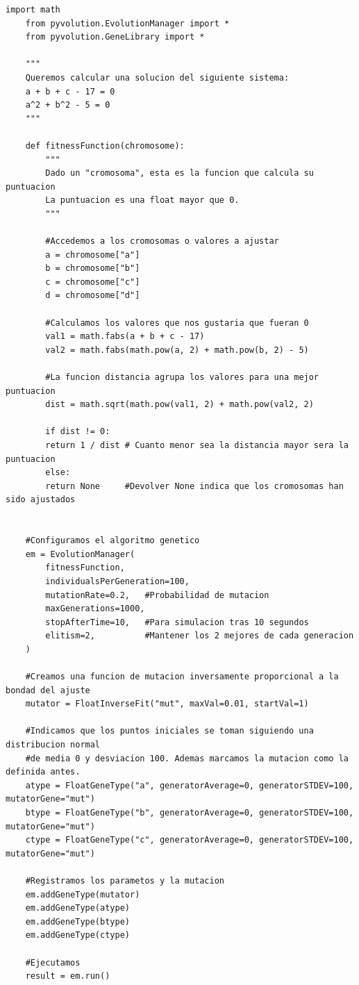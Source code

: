 \documentclass[12pt,a4paper]{article}
\begin{document}
		\begin{lstlisting}[basicstyle=\tiny]
	import math
	from pyvolution.EvolutionManager import *
	from pyvolution.GeneLibrary import *
	
	"""
	Queremos calcular una solucion del siguiente sistema:
	a + b + c - 17 = 0
	a^2 + b^2 - 5 = 0
	"""
		
	def fitnessFunction(chromosome):
		"""
		Dado un "cromosoma", esta es la funcion que calcula su puntuacion
		La puntuacion es una float mayor que 0.
		"""
		
		#Accedemos a los cromosomas o valores a ajustar
		a = chromosome["a"]
		b = chromosome["b"]
		c = chromosome["c"]
		d = chromosome["d"]
		
		#Calculamos los valores que nos gustaria que fueran 0
		val1 = math.fabs(a + b + c - 17)
		val2 = math.fabs(math.pow(a, 2) + math.pow(b, 2) - 5)
		
		#La funcion distancia agrupa los valores para una mejor puntuacion
		dist = math.sqrt(math.pow(val1, 2) + math.pow(val2, 2)
		
		if dist != 0:
		return 1 / dist # Cuanto menor sea la distancia mayor sera la puntuacion
		else:
		return None     #Devolver None indica que los cromosomas han sido ajustados
		
		
	#Configuramos el algoritmo genetico
	em = EvolutionManager(
		fitnessFunction,
		individualsPerGeneration=100,
		mutationRate=0.2,	#Probabilidad de mutacion
		maxGenerations=1000,
		stopAfterTime=10,   #Para simulacion tras 10 segundos
		elitism=2,          #Mantener los 2 mejores de cada generacion
	)
		
	#Creamos una funcion de mutacion inversamente proporcional a la bondad del ajuste
	mutator = FloatInverseFit("mut", maxVal=0.01, startVal=1)
		
	#Indicamos que los puntos iniciales se toman siguiendo una distribucion normal
	#de media 0 y desviacion 100. Ademas marcamos la mutacion como la definida antes.
	atype = FloatGeneType("a", generatorAverage=0, generatorSTDEV=100, mutatorGene="mut")
	btype = FloatGeneType("b", generatorAverage=0, generatorSTDEV=100, mutatorGene="mut")
	ctype = FloatGeneType("c", generatorAverage=0, generatorSTDEV=100, mutatorGene="mut")
		
	#Registramos los parametos y la mutacion
	em.addGeneType(mutator)
	em.addGeneType(atype)
	em.addGeneType(btype)
	em.addGeneType(ctype)
	
	#Ejecutamos	
	result = em.run()
		\end{lstlisting}
	
\end{document}
